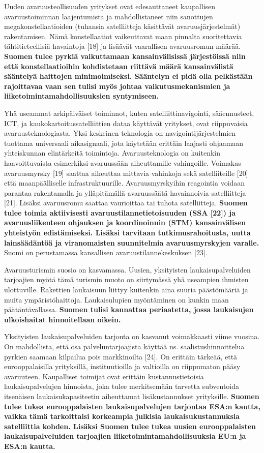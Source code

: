 \documentclass[nobib,finnish,oneside,openany,notoc,a4paper]{tufte-book}
\begin{document}
Uuden avaruusteollisuuden yritykset ovat edesauttaneet kaupallisen
avaruustoiminnan laajentumista ja mahdollistaneet niin sanottujen
megakonstellaatioiden (tuhansia satelliitteja käsittävät
avaruusjärjestelmät) rakentamisen. Nämä konstellaatiot vaikeuttavat maan
pinnalta suoritettavia tähtitieteellisiä havaintoja {[}18{]} ja lisäävät
vaarallisen avaruusromun määrää. \textbf{Suomen tulee pyrkiä
vaikuttamaan kansainvälisissä järjestöissä niin että konstellaatioihin
kohdistetaan riittävä määrä kansainvälistä sääntelyä haittojen
minimoimiseksi. Sääntelyn ei pidä olla pelkästään rajoittavaa vaan sen
tulisi myös johtaa vaikutusmekanismien ja liiketoimintamahdollisuuksien
syntymiseen. }

Yhä useammat arkipäiväiset toiminnot, kuten satelliittinavigointi,
sääennusteet, ICT, ja kaukokartoitussatelliittien dataa käyttävät
yritykset, ovat riippuvaisia avaruusteknologiasta. Yksi keskeinen
teknologia on navigointijärjestelmien tuottama universaali aikasignaali,
jota käytetään erittäin laajasti ohjaamaan yhteiskunnan elintärkeitä
toimintoja. Avaruusteknologia on kuitenkin haavoittuvaista esimerkiksi
avaruussään aiheuttamille vahingoille. Voimakas avaruusmyrsky {[}19{]}
saattaa aiheuttaa mittavia vahinkoja sekä satelliiteille {[}20{]} että
maanpäälliselle infrastruktuurille. Avaruusmyrskyihin reagointia voidaan
parantaa rakentamalla ja ylläpitämällä avaruussäätä havainnoivia
satelliitteja {[}21{]}. Lisäksi avaruusromu saattaa vaurioittaa tai
tuhota satelliitteja. \textbf{Suomen tulee toimia aktiivisesti
avaruustilannetietoisuuden (SSA {[}22{]}) ja avaruusliikenteen ohjauksen
ja koordinoinnin (STM) kansainvälisen yhteistyön edistämiseksi. Lisäksi
tarvitaan tutkimusrahoitusta, uutta lainsäädäntöä ja viranomaisten
suunnitelmia avaruusmyrskyjen varalle.} Suomi on perustamassa
kansallisen avaruustilannekeskuksen {[}23{]}.

Avaruusturismin suosio on kasvamassa. Uusien, yksityisten
laukaisupalveluiden tarjoajien myötä tämä turismin muoto on siirtymässä
yhä useampien ihmisten ulottuville. Rakettien laukaisuun liittyy
kuitenkin aina suuria päästömääriä ja muita ympäristöhaittoja.
Laukaisulupien myöntäminen on kunkin maan päätäntävallassa.
\textbf{Suomen tulisi kannattaa periaatetta, jossa laukaisujen
ulkoishaitat hinnoitellaan oikein. }

Yksityisten laukaisupalveluiden tarjonta on kasvanut voimakkaasti viime
vuosina. On mahdollista, että osa palveluntarjoajista käyttää ns.
saalistushinnoittelua pyrkien saamaan kilpailua pois markkinoilta
{[}24{]}. On erittäin tärkeää, että eurooppalaisilla yrityksillä,
instituutioilla ja valtioilla on riippumaton pääsy avaruuteen.
Kaupalliset toimijat ovat erittäin kustannustietoisia laukaisupalvelujen
hinnoista, joka tulee merkitsemään tarvetta subventoida itsenäisen
laukaisukapasiteetin aiheuttamat lisäkustannukset yrityksille.
\textbf{Suomen tulee tukea eurooppalaisten laukaisupalvelujen tarjontaa
ESA:n kautta, vaikka tämä tarkoittaisi korkeampia julkisia
laukaisukustannuksia satelliittia kohden. Lisäksi Suomen tulee tukea
uusien eurooppalaisten laukaisupalveluiden tarjoajien
liiketoimintamahdollisuuksia EU:n ja ESA:n kautta. }
\end{document}
